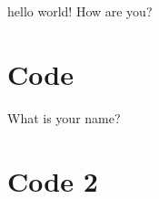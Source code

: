 \documentclass{article}
\begin{document}
    hello world!
    How are you?
    \section{Code}
    What is your name?
    \section{Code 2}
\end{document}
